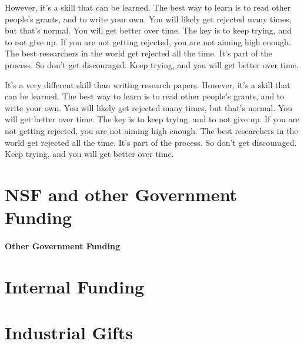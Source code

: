 \documentclass[oneside,11pt,dvipsnames]{book}
\begin{document}
However, it's a skill that can be learned.  The best way to learn is to read other people's grants, and to write your own.  You will likely get rejected many times, but that's normal.  You will get better over time.  The key is to keep trying, and to not give up.  If you are not getting rejected, you are not aiming high enough.  The best researchers in the world get rejected all the time.  It's part of the process.  So don't get discouraged.  Keep trying, and you will get better over time.


It's a very different skill than writing research papers.  However, it's a skill that can be learned.  The best way to learn is to read other people's grants, and to write your own.  You will likely get rejected many times, but that's normal.  You will get better over time.  The key is to keep trying, and to not give up.  If you are not getting rejected, you are not aiming high enough.  The best researchers in the world get rejected all the time.  It's part of the process.  So don't get discouraged.  Keep trying, and you will get better over time.
\section{NSF and other Government Funding}

\paragraph{Other Government Funding}

\section{Internal Funding}

\section{Industrial Gifts}
\end{document}
